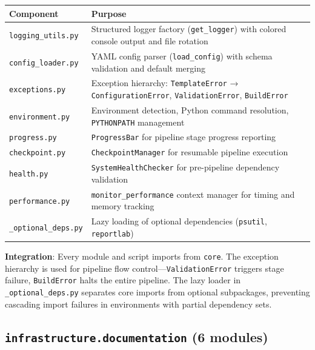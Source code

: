 \documentclass[
]{article}
\newcounter{none} %
\begin{document}
{\def\LTcaptype{none} %
\begin{longtable}[]{@{}
  >{\raggedright\arraybackslash}p{}
  >{\raggedright\arraybackslash}p{}@{}}
\toprule\noalign{}
\begin{minipage}[b]{\linewidth}\raggedright
Component
\end{minipage} & \begin{minipage}[b]{\linewidth}\raggedright
Purpose
\end{minipage} \\
\midrule\noalign{}
\endhead
\bottomrule\noalign{}
\endlastfoot
\texttt{logging\_utils.py} & Structured logger factory
(\texttt{get\_logger}) with colored console output and file rotation \\
\texttt{config\_loader.py} & YAML config parser (\texttt{load\_config})
with schema validation and default merging \\
\texttt{exceptions.py} & Exception hierarchy: \texttt{TemplateError} →
\texttt{ConfigurationError}, \texttt{ValidationError},
\texttt{BuildError} \\
\texttt{environment.py} & Environment detection, Python command
resolution, \texttt{PYTHONPATH} management \\
\texttt{progress.py} & \texttt{ProgressBar} for pipeline stage progress
reporting \\
\texttt{checkpoint.py} & \texttt{CheckpointManager} for resumable
pipeline execution \\
\texttt{health.py} & \texttt{SystemHealthChecker} for pre-pipeline
dependency validation \\
\texttt{performance.py} & \texttt{monitor\_performance} context manager
for timing and memory tracking \\
\texttt{\_optional\_deps.py} & Lazy loading of optional dependencies
(\texttt{psutil}, \texttt{reportlab}) \\
\end{longtable}
}

\textbf{Integration}: Every module and script imports from
\texttt{core}. The exception hierarchy is used for pipeline flow
control---\texttt{ValidationError} triggers stage failure,
\texttt{BuildError} halts the entire pipeline. The lazy loader in
\texttt{\_optional\_deps.py} separates core imports from optional
subpackages, preventing cascading import failures in environments with
partial dependency sets.

\subsection{\texorpdfstring{\texttt{infrastructure.documentation} (6
modules)}{infrastructure.documentation (6 modules)}}\label{infrastructure.documentation-6-modules}
\end{document}
